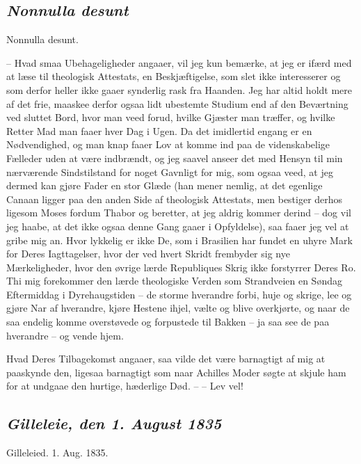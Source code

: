 \documentclass[12pt,a4paper]{article}
\newcommand{\sectionheading}[1]{\subsection*{\normalfont\itshape #1}}
\begin{document}
\sectionheading{Nonnulla desunt}

Nonnulla desunt.

– Hvad smaa Ubehageligheder angaaer, vil jeg kun bemærke, at jeg er ifærd med at læse til theologisk Attestats, en Beskjæftigelse, som slet ikke interesserer og som derfor heller ikke gaaer synderlig rask fra Haanden. Jeg har altid holdt mere af det frie, maaskee derfor ogsaa lidt ubestemte Studium end af den Beværtning ved sluttet Bord, hvor man veed forud, hvilke Gjæster man træffer, og hvilke Retter Mad man faaer hver Dag i Ugen. Da det imidlertid engang er en Nødvendighed, og man knap faaer Lov at komme ind paa de videnskabelige Fælleder uden at være indbrændt, og jeg saavel anseer det med Hensyn til min nærværende Sindstilstand for noget Gavnligt for mig, som ogsaa veed, at jeg dermed kan gjøre Fader en stor Glæde (han mener nemlig, at det egenlige Canaan ligger paa den anden Side af theologisk Attestats, men bestiger derhos ligesom Moses fordum Thabor og beretter, at jeg aldrig kommer derind – dog vil jeg haabe, at det ikke ogsaa denne Gang gaaer i Opfyldelse), saa faaer jeg vel at gribe mig an. Hvor lykkelig er ikke De, som i Brasilien har fundet en uhyre Mark for Deres Iagttagelser, hvor der ved hvert Skridt frembyder sig nye Mærkeligheder, hvor den øvrige lærde Republiques Skrig ikke forstyrrer Deres Ro. Thi mig forekommer den lærde theologiske Verden som Strandveien en Søndag Eftermiddag i Dyrehaugstiden – de storme hverandre forbi, huje og skrige, lee og gjøre Nar af hverandre, kjøre Hestene ihjel, vælte og blive overkjørte, og naar de saa endelig komme overstøvede og forpustede til Bakken – ja saa see de paa hverandre – og vende hjem.

Hvad Deres Tilbagekomst angaaer, saa vilde det være barnagtigt af mig at paaskynde den, ligesaa barnagtigt som naar Achilles Moder søgte at skjule ham for at undgaae den hurtige, hæderlige Død. – – Lev vel!

\sectionheading{Gilleleie, den 1. August 1835}

Gilleleied. 1. Aug. 1835.
\end{document}
